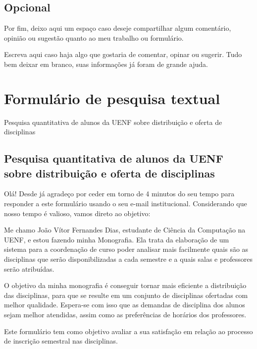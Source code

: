 \begin{apendicesenv}
\begin{Form}[action=mailto:joaovitorfd2000@gmail.com, encoding=html, method=post]
    \section*{Opcional}

    Por fim, deixo aqui um espaço caso deseje compartilhar algum comentário, opinião ou sugestão quanto ao meu trabalho ou formulário.

    Escreva aqui caso haja algo que gostaria de comentar, opinar ou sugerir. Tudo bem deixar em branco, suas informações já foram de grande ajuda.

    \TextField[multiline=true, width=0.8\linewidth, name=comentario]{ }


  \end{Form}

  \chapter{Formulário de pesquisa textual} \label{apendice:FormularioPesquisaQuantitativaTextual}

  Pesquisa quantitativa de alunos da UENF sobre distribuição e oferta de disciplinas

  \section*{Pesquisa quantitativa de alunos da UENF sobre distribuição e oferta de disciplinas}

  Olá! Desde já agradeço por ceder em torno de 4 minutos do seu tempo para responder a este formulário usando o seu e-mail institucional. Considerando que nosso tempo é valioso, vamos direto ao objetivo:

  Me chamo João Vítor Fernandes Dias, estudante de Ciência da Computação na UENF, e estou fazendo minha Monografia. Ela trata da elaboração de um sistema para a coordenação de curso poder analisar mais facilmente quais são as disciplinas que serão disponibilizadas a cada semestre e a quais salas e professores serão atribuídas.

  O objetivo da minha monografia é conseguir tornar mais eficiente a distribuição das disciplinas, para que se resulte em um conjunto de disciplinas ofertadas com melhor qualidade. Espera-se com isso que as demandas de disciplina dos alunos sejam melhor atendidas, assim como as preferências de horários dos professores.

  Este formulário tem como objetivo avaliar a sua satisfação em relação ao processo de inscrição semestral nas disciplinas.


\end{apendicesenv}
